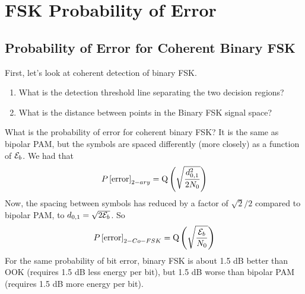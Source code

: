 




\section{FSK Probability of Error}

\subsection{Probability of Error for Coherent Binary FSK}

First, let's look at coherent detection of binary FSK.
\begin{enumerate}
 \item What is the detection threshold line separating the two decision
regions?
 \item What is the distance between points in the Binary FSK signal space?
\end{enumerate}
What is the probability of error for coherent binary FSK?  It
is the same as bipolar PAM, but the symbols are spaced differently (more closely) as a function of $\mathcal{E}_b$.  We had that
\[
P\left[{\mbox{error}}\right]_{2-ary} = {\mbox{Q}\left( {\sqrt{\frac{d_{0,1}^2}{2N_0}}} \right)}
\]
Now, the spacing between symbols has reduced by a factor of $\sqrt{2}/2$ compared to bipolar PAM, to $d_{0,1} = \sqrt{2\mathcal{E}_b}$.  So
\[
P\left[{\mbox{error}}\right]_{2-Co-FSK} = {\mbox{Q}\left( {\sqrt{\frac{\mathcal{E}_b}{N_0}}} \right)}
\]
For the same probability of bit error, binary FSK is about 1.5 dB better than OOK (requires 1.5 dB less energy per bit), but 1.5 dB worse than bipolar PAM (requires 1.5 dB more energy per bit).


